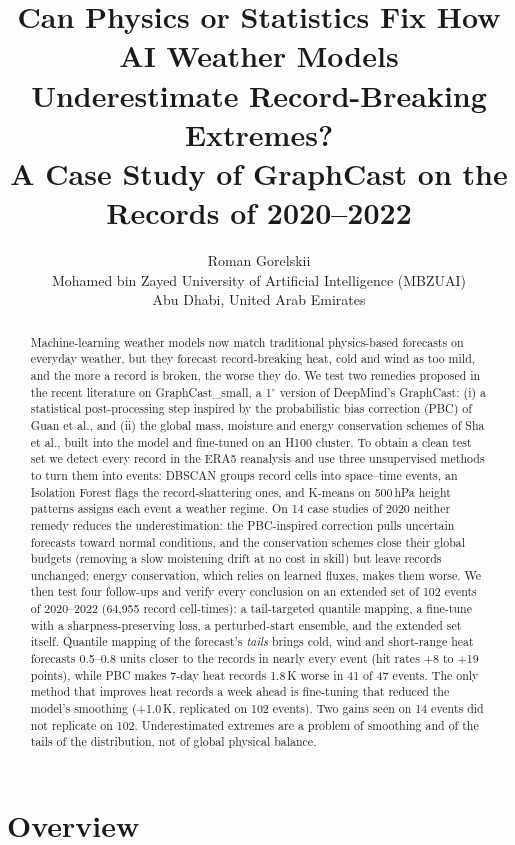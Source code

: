 \documentclass{article}
\title{Can Physics or Statistics Fix How AI Weather Models\\Underestimate Record-Breaking Extremes?\\
A Case Study of GraphCast on the Records of 2020--2022}
\author{%
  Roman Gorelskii\\
  Mohamed bin Zayed University of Artificial Intelligence (MBZUAI)\\
  Abu Dhabi, United Arab Emirates
}
\begin{document}
\maketitle

\begin{abstract}
Machine-learning weather models now match traditional physics-based forecasts on everyday
weather, but they forecast record-breaking heat, cold and wind as too mild, and the more a record is broken, the worse they do.
We test two remedies proposed in the recent literature on GraphCast\_small, a
1$^\circ$ version of DeepMind's GraphCast: (i) a statistical post-processing step inspired by the
probabilistic bias correction (PBC) of Guan et al., and (ii) the global mass, moisture and energy
conservation schemes of Sha et al., built into the model and fine-tuned on an H100 cluster.
To obtain a clean test set we detect every record in the ERA5 reanalysis and
use three unsupervised methods to turn them into events: DBSCAN groups record cells into
space--time events, an Isolation Forest flags the record-shattering ones, and K-means on
500\,hPa height patterns assigns each event a weather regime. On 14 case studies of 2020 neither remedy reduces the underestimation:
the PBC-inspired correction pulls uncertain forecasts toward normal conditions, and the conservation schemes close their global budgets
(removing a slow moistening drift at no cost in skill) but leave records unchanged; energy conservation, which relies on learned fluxes, makes them worse.
We then test four follow-ups and verify every conclusion on an extended set of 102 events of 2020--2022 (64{,}955 record cell-times):
a tail-targeted quantile mapping, a fine-tune with a sharpness-preserving loss, a perturbed-start ensemble, and the extended set itself.
Quantile mapping of the forecast's \emph{tails} brings cold, wind and short-range heat forecasts 0.5--0.8 units closer to the records in nearly every event
(hit rates +8 to +19 points), while PBC makes 7-day heat records 1.8\,K worse in 41 of 47 events. The only method that improves heat records a week ahead
is fine-tuning that reduced the model's smoothing (+1.0\,K, replicated on 102 events). Two gains seen on 14 events did not replicate on 102.
Underestimated extremes are a problem of smoothing and of the tails of the distribution, not of global physical balance.
\end{abstract}

\section{Overview}
\label{sec:overview}
\end{document}
